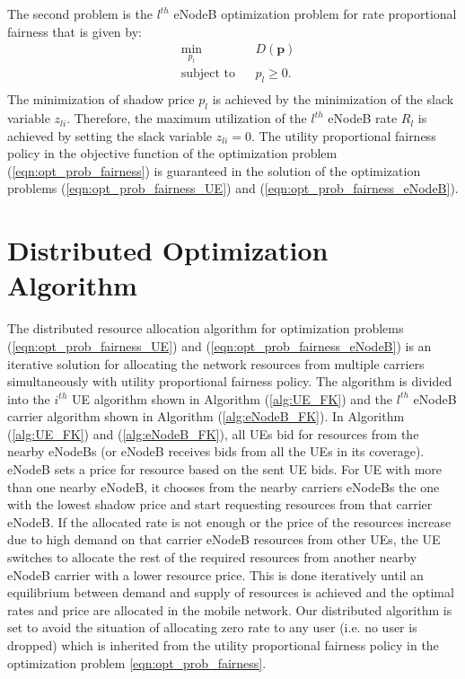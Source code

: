 \documentclass[conference]{IEEEtran}
\begin{document}
The second problem is the $l^{th}$ eNodeB optimization problem for rate proportional fairness that is given by: 
\begin{equation}\label{eqn:opt_prob_fairness_eNodeB}
\begin{aligned}
& \underset{p_l}{\text{min}}
& & D(\textbf{p}) \\
& \text{subject to}
& & p_l \geq 0.\\
\end{aligned}
\end{equation}
The minimization of shadow price $p_l$ is achieved by the minimization of the slack variable $z_{li}$. Therefore, the maximum utilization of the $l^{th}$ eNodeB rate $R_l$ is achieved by setting the slack variable $z_{li} = 0$. The utility proportional fairness policy in the objective function of the optimization problem (\ref{eqn:opt_prob_fairness}) is guaranteed in the solution of the optimization problems (\ref{eqn:opt_prob_fairness_UE}) and (\ref{eqn:opt_prob_fairness_eNodeB}).

\section{Distributed Optimization Algorithm}\label{sec:Algorithm}

The distributed resource allocation algorithm for optimization problems (\ref{eqn:opt_prob_fairness_UE}) and (\ref{eqn:opt_prob_fairness_eNodeB}) is an iterative solution for allocating the network resources from multiple carriers simultaneously with utility proportional fairness policy. The algorithm is divided into the $i^{th}$ UE algorithm shown in Algorithm (\ref{alg:UE_FK}) and the $l^{th}$ eNodeB carrier algorithm shown in Algorithm (\ref{alg:eNodeB_FK}). In Algorithm (\ref{alg:UE_FK}) and (\ref{alg:eNodeB_FK}), all UEs bid for resources from the nearby eNodeBs (or eNodeB receives bids from all the UEs in its coverage). eNodeB sets a price for resource based on the sent UE bids. For UE with more than one nearby eNodeB, it chooses from the nearby carriers eNodeBs the one with the lowest shadow price and start requesting resources from that carrier eNodeB. If the allocated rate is not enough or the price of the resources increase due to high demand on that carrier eNodeB resources from other UEs, the UE 
switches to allocate the rest of the required resources from another nearby eNodeB carrier with a lower resource price. This is done iteratively until an equilibrium between demand and supply of resources is achieved and the optimal rates and price are allocated in the mobile network. Our distributed algorithm is set to avoid the situation of allocating zero rate to any user (i.e. no user is dropped) which is inherited from the utility proportional fairness policy in the optimization problem \ref{eqn:opt_prob_fairness}. 
\end{document}
